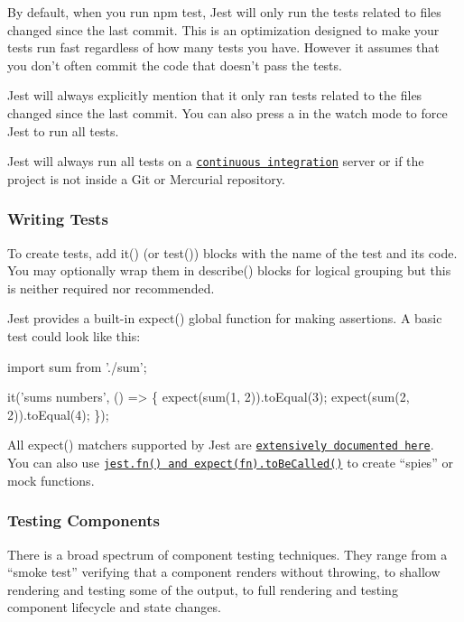 By default, when you run {\ttfamily npm test}, Jest will only run the tests related to files changed since the last commit. This is an optimization designed to make your tests run fast regardless of how many tests you have. However it assumes that you don’t often commit the code that doesn’t pass the tests.

Jest will always explicitly mention that it only ran tests related to the files changed since the last commit. You can also press {\ttfamily a} in the watch mode to force Jest to run all tests.

Jest will always run all tests on a \href{#continuous-integration}{\tt continuous integration} server or if the project is not inside a Git or Mercurial repository.

\subsubsection*{Writing Tests}

To create tests, add {\ttfamily it()} (or {\ttfamily test()}) blocks with the name of the test and its code. You may optionally wrap them in {\ttfamily describe()} blocks for logical grouping but this is neither required nor recommended.

Jest provides a built-\/in {\ttfamily expect()} global function for making assertions. A basic test could look like this\+:


\begin{DoxyCode}
import sum from './sum';

it('sums numbers', () => \{
  expect(sum(1, 2)).toEqual(3);
  expect(sum(2, 2)).toEqual(4);
\});
\end{DoxyCode}


All {\ttfamily expect()} matchers supported by Jest are \href{http://facebook.github.io/jest/docs/expect.html}{\tt extensively documented here}.~\newline
 You can also use \href{http://facebook.github.io/jest/docs/expect.html#tohavebeencalled}{\tt {\ttfamily jest.\+fn()} and {\ttfamily expect(fn).to\+Be\+Called()}} to create “spies” or mock functions.

\subsubsection*{Testing Components}

There is a broad spectrum of component testing techniques. They range from a “smoke test” verifying that a component renders without throwing, to shallow rendering and testing some of the output, to full rendering and testing component lifecycle and state changes.


